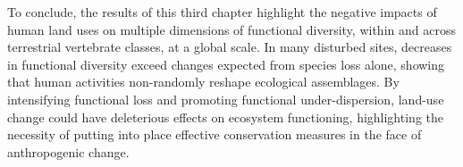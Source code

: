 To conclude, the results of this third chapter highlight the negative impacts of human land uses on multiple dimensions of functional diversity, within and across terrestrial vertebrate classes, at a global scale. In many disturbed sites, decreases in functional diversity exceed changes expected from species loss alone, showing that human activities non-randomly reshape ecological assemblages. By intensifying functional loss and promoting functional under-dispersion, land-use change could have deleterious effects on ecosystem functioning, highlighting the necessity of putting into place effective conservation measures in the face of anthropogenic change.